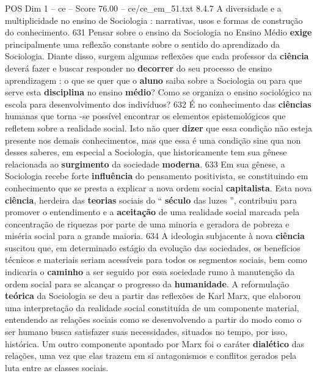 \begin{textsample}{POS Dim 1 – ce – Score 76.00 – ce/ce\_em\_51.txt}  \label{ex:f1_pos_042}
8.4.7 A diversidade e a multiplicidade no ensino de Sociologia : narrativas, usos e formas de construção do conhecimento. 631 Pensar sobre o ensino da Sociologia no Ensino Médio \textbf{exige} principalmente uma reflexão constante sobre o sentido do aprendizado da Sociologia.
Diante disso, surgem algumas reflexões que cada professor da \textbf{ciência} deverá fazer e buscar responder no \textbf{decorrer} do seu processo de ensino aprendizagem : o que se quer que o \textbf{aluno} saiba sobre a Sociologia ou para que serve esta \textbf{disciplina} no ensino \textbf{médio}?
Como se organiza o ensino sociológico na escola para desenvolvimento dos indivíduos? 632 É no conhecimento das \textbf{ciências} humanas que torna -se possível encontrar os elementos epistemológicos que refletem sobre a realidade social.
Isto não quer \textbf{dizer} que essa condição não esteja presente nos demais conhecimentos, mas que essa é uma condição sine qua non desses saberes, em especial a Sociologia, que historicamente tem sua gênese relacionada ao \textbf{surgimento} da sociedade \textbf{moderna}. 633 Em sua gênese, a Sociologia recebe forte \textbf{influência} do pensamento positivista, se constituindo em conhecimento que se presta a explicar a nova ordem social \textbf{capitalista}.
Esta nova \textbf{ciência}, herdeira das \textbf{teorias} sociais do “ \textbf{século} das luzes ”, contribuiu para promover o entendimento e a \textbf{aceitação} de uma realidade social marcada pela concentração de riquezas por parte de uma minoria e geradora de pobreza e miséria social para a grande maioria. 634 A ideologia subjacente à nova \textbf{ciência} suscitou que, em determinado estágio da evolução das sociedades, os benefícios técnicos e materiais seriam acessíveis para todos os segmentos sociais, bem como indicaria o \textbf{caminho} a ser seguido por essa sociedade rumo à manutenção da ordem social para se alcançar o progresso da \textbf{humanidade}.
A reformulação \textbf{teórica} da Sociologia se deu a partir das reflexões de Karl Marx, que elaborou uma interpretação da realidade social constituída de um componente material, entendendo as relações sociais como se desenvolvendo a partir do modo como o ser humano busca satisfazer suas necessidades, situados no tempo, por isso, histórica.
Um outro componente apontado por Marx foi o caráter \textbf{dialético} das relações, uma vez que elas trazem em si antagonismos e conflitos gerados pela luta entre as classes sociais.

\end{textsample}
